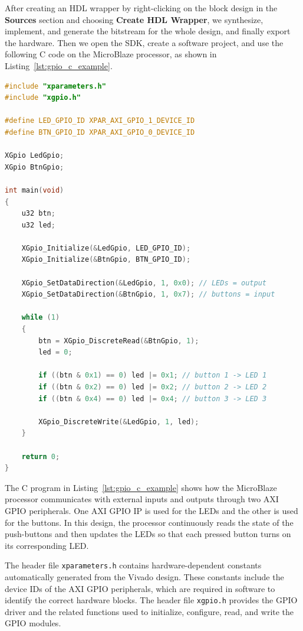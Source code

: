 \documentclass{article}
\begin{document}
After creating an HDL wrapper by right-clicking on the block design in the \textbf{Sources} section and choosing \textbf{Create HDL Wrapper}, we synthesize, implement, and generate the bitstream for the whole design, and finally export the hardware. Then we open the SDK, create a software project, and use the following C code on the MicroBlaze processor, as shown in Listing~\ref{lst:gpio_c_example}.

\begin{lstlisting}[language=C, caption={Example C program for controlling LEDs with buttons using AXI GPIO}, label={lst:gpio_c_example}]
#include "xparameters.h"
#include "xgpio.h"

#define LED_GPIO_ID XPAR_AXI_GPIO_1_DEVICE_ID
#define BTN_GPIO_ID XPAR_AXI_GPIO_0_DEVICE_ID

XGpio LedGpio;
XGpio BtnGpio;

int main(void)
{
    u32 btn;
    u32 led;

    XGpio_Initialize(&LedGpio, LED_GPIO_ID);
    XGpio_Initialize(&BtnGpio, BTN_GPIO_ID);

    XGpio_SetDataDirection(&LedGpio, 1, 0x0); // LEDs = output
    XGpio_SetDataDirection(&BtnGpio, 1, 0x7); // buttons = input

    while (1)
    {
        btn = XGpio_DiscreteRead(&BtnGpio, 1);
        led = 0;

        if ((btn & 0x1) == 0) led |= 0x1; // button 1 -> LED 1
        if ((btn & 0x2) == 0) led |= 0x2; // button 2 -> LED 2
        if ((btn & 0x4) == 0) led |= 0x4; // button 3 -> LED 3

        XGpio_DiscreteWrite(&LedGpio, 1, led);
    }

    return 0;
}
\end{lstlisting}

The C program in Listing~\ref{lst:gpio_c_example} shows how the MicroBlaze processor communicates with external inputs and outputs through two AXI GPIO peripherals. One AXI GPIO IP is used for the LEDs and the other is used for the buttons. In this design, the processor continuously reads the state of the push-buttons and then updates the LEDs so that each pressed button turns on its corresponding LED.

The header file \texttt{xparameters.h} contains hardware-dependent constants automatically generated from the Vivado design. These constants include the device IDs of the AXI GPIO peripherals, which are required in software to identify the correct hardware blocks. The header file \texttt{xgpio.h} provides the GPIO driver and the related functions used to initialize, configure, read, and write the GPIO modules.
\end{document}
